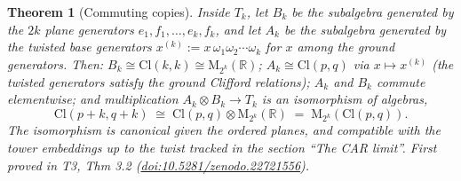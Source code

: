 \documentclass[11pt]{article}
\newtheorem{theorem}{Theorem}[section]
\theoremstyle{definition}
\theoremstyle{plain}
\providecommand{\Cl}{}\renewcommand{\Cl}{\mathrm{Cl}}
\providecommand{\Mat}{}\renewcommand{\Mat}{\mathrm{M}}
\providecommand{\R}{}\renewcommand{\R}{\mathbb{R}}
\begin{document}
\begin{theorem}[Commuting copies]\label{c:tower.commuting-copies}
Inside $T_k$, let $B_k$ be the subalgebra generated by the $2k$ plane generators $e_1, f_1, \dots, e_k, f_k$, and let $A_k$ be the subalgebra generated by the twisted base generators $x^{(k)} := x\,\omega_1 \omega_2 \cdots \omega_k$ for $x$ among the ground generators. Then: $B_k \cong \Cl(k,k) \cong \Mat_{2^k}(\R)$; $A_k \cong \Cl(p,q)$ via $x \mapsto x^{(k)}$ (the twisted generators satisfy the ground Clifford relations); $A_k$ and $B_k$ commute elementwise; and multiplication $A_k \otimes B_k \to T_k$ is an isomorphism of algebras,
\[
\Cl(p{+}k, q{+}k) \;\cong\; \Cl(p,q) \otimes \Mat_{2^k}(\R) \;=\; \Mat_{2^k}(\Cl(p,q)).
\]
The isomorphism is canonical given the ordered planes, and compatible with the tower embeddings up to the twist tracked in the section ``The CAR limit''.
\emph{First proved in} T3, Thm 3.2 (\href{https://doi.org/10.5281/zenodo.22721556}{doi:10.5281/zenodo.22721556}).
\end{theorem}
\end{document}
